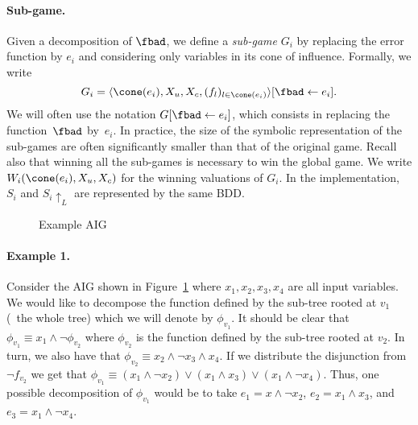 \documentclass[submission,copyright,creativecommons]{eptcs}
\begin{document}
\paragraph{Sub-game.}
Given a decomposition of $\fbad$, we define a \emph{sub-game} $G_i$ by replacing
the error function by $e_i$ and considering only variables in its cone of
influence. Formally, we write 
\[
	G_i = \langle \cone(e_i), X_u, X_c, (f_l)_{l \in \cone(e_i)}
	\rangle[\fbad \leftarrow e_i].
\]
We will often use the notation
$G[\fbad \leftarrow e_i]$, which consists in replacing the function~$\fbad$
by~$e_i$.  In practice, the size of the symbolic representation of the sub-games
are often significantly smaller than that of the original game. Recall also that
winning all the sub-games is necessary to win the global game.  We write
$W_i(\cone(e_i),X_u,X_c)$ for the winning valuations of $G_i$.
In the implementation, $S_i$ and $S_i \uparrow_L$ are represented by the same BDD.

\begin{figure}
\centering
{}
\caption{Example AIG}
\label{fig:example-aig-1}
\end{figure}

\paragraph{Example 1.} Consider the AIG shown in
Figure~\ref{fig:example-aig-1} where $x_1,x_2,x_3,x_4$ are all input variables.
We would like to decompose the function defined by the sub-tree rooted at $v_1$
(\ie\ the whole tree) which we will denote by $\phi_{v_1}$. It should be clear that
\(
	\phi_{v_1} \equiv x_1 \land \lnot \phi_{v_2}
\)
where $\phi_{v_2}$ is the function defined by the sub-tree rooted at $v_2$. In
turn, we also have that
\(
	\phi_{v_2} \equiv x_2 \land \lnot x_3 \land x_4.
\)
If we distribute the disjunction from $\lnot f_{v_2}$ we get that
\(
	\phi_{v_1} \equiv (x_1 \land \lnot x_2) \lor
		(x_1 \land x_3) \lor 
		(x_1 \land \lnot x_4).
\)
Thus, one possible decomposition of $\phi_{v_1}$ would be to take $e_1 = x \land
\lnot x_2$, $e_2 = x_1 \land x_3$, and $e_3 = x_1 \land \lnot x_4$.
\end{document}
